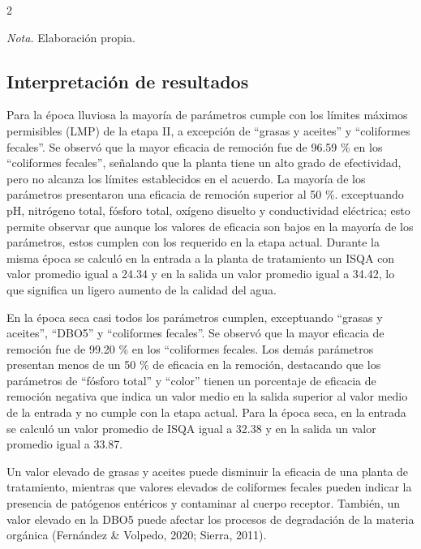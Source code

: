 \documentclass[12pt,spanish,Letterpaper,openany]{book}
\begin{document}
\begin {multicols}{2}
\begin {flushleft}
\begin{minipage}[c]{\columnwidth}
\emph{Nota.} Elaboración propia.

\end{minipage}
\end {flushleft}

\bigskip
\bigskip
\bigskip
\bigskip
\bigskip
\bigskip

\hypertarget{interpretaciuxf3n-de-resultados}{%
\subsection{Interpretación de resultados}\label{interpretaciuxf3n-de-resultados}}

Para la época lluviosa la mayoría de parámetros cumple con los límites máximos permisibles (LMP) de la etapa II, a excepción de ``grasas y aceites'' y ``coliformes fecales''. Se observó que la mayor eficacia de remoción fue de 96.59 \% en los ``coliformes fecales'', señalando que la planta tiene un alto grado de efectividad, pero no alcanza los límites establecidos en el acuerdo. La mayoría de los parámetros presentaron una eficacia de remoción superior al 50 \%. exceptuando pH, nitrógeno total, fósforo total, oxígeno disuelto y conductividad eléctrica; esto permite observar que aunque los valores de eficacia son bajos en la mayoría de los parámetros, estos cumplen con los requerido en la etapa actual. Durante la misma época se calculó en la entrada a la planta de tratamiento un ISQA con valor promedio igual a 24.34 y en la salida un valor promedio igual a 34.42, lo que significa un ligero aumento de la calidad del agua.

En la época seca casi todos los parámetros cumplen, exceptuando ``grasas y aceites'', ``DBO5'' y ``coliformes fecales''. Se observó que la mayor eficacia de remoción fue de 99.20 \% en los ``coliformes fecales. Los demás parámetros presentan menos de un 50 \% de eficacia en la remoción, destacando que los parámetros de ``fósforo total'' y ``color'' tienen un porcentaje de eficacia de remoción negativa que indica un valor medio en la salida superior al valor medio de la entrada y no cumple con la etapa actual. Para la época seca, en la entrada se calculó un valor promedio de ISQA igual a 32.38 y en la salida un valor promedio igual a 33.87.

Un valor elevado de grasas y aceites puede disminuir la eficacia de una planta de tratamiento, mientras que valores elevados de coliformes fecales pueden indicar la presencia de patógenos entéricos y contaminar al cuerpo receptor. También, un valor elevado en la DBO5 puede afectar los procesos de degradación de la materia orgánica (Fernández \& Volpedo, 2020; Sierra, 2011).


\end{multicols}
\end{document}
